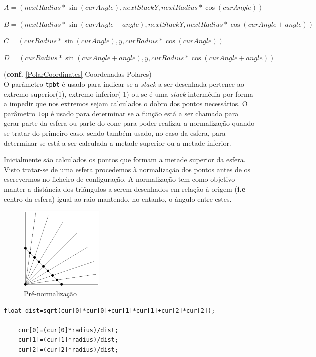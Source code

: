 \documentclass{article}
\begin{document}
$A=(nextRadius*\sin(curAngle),nextStackY,nextRadius*\cos(curAngle))$

$B=(nextRadius*\sin(curAngle+angle),nextStackY,nextRadius*\cos(curAngle+angle))$

$C=(curRadius*\sin(curAngle),y,curRadius*\cos(curAngle))$

$D=(curRadius*\sin(curAngle+angle),y,curRadius*\cos(curAngle+angle))$


(\textbf{conf.} \ref{PolarCoordinates}-Coordenadas Polares)
\\

O parâmetro \texttt{tpbt} é usado para indicar se a \textit{stack} a ser desenhada pertence ao extremo superior(1), extremo inferior(-1) ou se é uma \textit{stack} intermédia por forma a impedir que nos extremos sejam calculados o dobro dos pontos necessários. O parâmetro \texttt{top} é usado para determinar se a função está a ser chamada para gerar parte da esfera ou parte do cone para poder realizar a normalização quando se tratar do primeiro caso, sendo também usado, no caso da esfera, para determinar se está a ser calculada a metade superior ou a metade inferior.

Inicialmente são calculados os pontos que formam a metade superior da esfera. Visto tratar-se de uma esfera procedemos à normalização dos pontos antes de os escrevermos no ficheiro de configuração. A normalização tem como objetivo manter a distância dos triângulos a serem desenhados em relação à origem (\textbf{i.e} centro da esfera) igual ao raio mantendo, no entanto, o ângulo entre estes.

\begin{figure}[H]
    \centering
    \includegraphics[height=4cm]{beforeNorm.png}
    \caption{Pré-normalização}
\end{figure}

\begin{Verbatim}[fontsize=\small]    
    float dist=sqrt(cur[0]*cur[0]+cur[1]*cur[1]+cur[2]*cur[2]);
      
    cur[0]=(cur[0]*radius)/dist;
    cur[1]=(cur[1]*radius)/dist;
    cur[2]=(cur[2]*radius)/dist;
\end{Verbatim}
\end{document}
